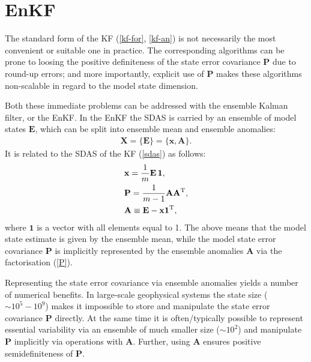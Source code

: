 \documentclass[11pt]{report}
\newcommand{\mb} {\mathbf}
\newcommand{\T}{^{\tiny \mathrm T}}
\begin{document}
\section{EnKF}

The standard form of the KF (\ref{kf-for}, \ref{kf-an}) is not necessarily the most convenient or suitable one in practice.
The corresponding algorithms can be prone to loosing the positive definiteness of the state error covariance $\mb P$ due to round-up errors; and more importantly, explicit use of $\mb P$ makes these algorithms non-scalable in regard to the model state dimension.

Both these immediate problems can be addressed with the ensemble Kalman filter, or the EnKF.
In the EnKF the SDAS is carried by an ensemble of model states $\mb E$, which can be split into ensemble mean and ensemble anomalies:
\begin{align}
  \label{sdas-enkf}
  \mb X = \{\mb E\} = \{\mb x, \mb A\}.
\end{align}
It is related to the SDAS of the KF (\ref{sdas}) as follows:
\begin{subequations}
  \label{E}
  \begin{align}
    \label{x}
    &\mb x = \frac{1}{m} \mb E \,\mb 1,\\
    \label{P}
    &\mb P = \frac{1}{m - 1} \mb A \mb A\T,\\
    \label{A}
    &\mb A \equiv \mb E - \mb x \mb 1\T,
  \end{align}
\end{subequations}
where $\mb 1$ is a vector with all elements equal to 1.
The above means that the model state estimate is given by the ensemble mean, while the model state error covariance $\mb P$ is implicitly represented by the ensemble anomalies $\mb A$ via the factorisation (\ref{P}).

Representing the state error covariance via ensemble anomalies yields a number of numerical benefits.
In large-scale geophysical systems the state size ($\sim 10^5-10^9$) makes it impossible to store and manipulate the state error covariance $\mb P$ directly.
At the same time it is often/typically possible to represent essential variability via an ensemble of much smaller size ($\sim 10^2$) and manipulate $\mb P$ implicitly via operations with $\mb A$.
Further, using $\mb A$ ensures positive semidefiniteness of $\mb P$.
\end{document}
